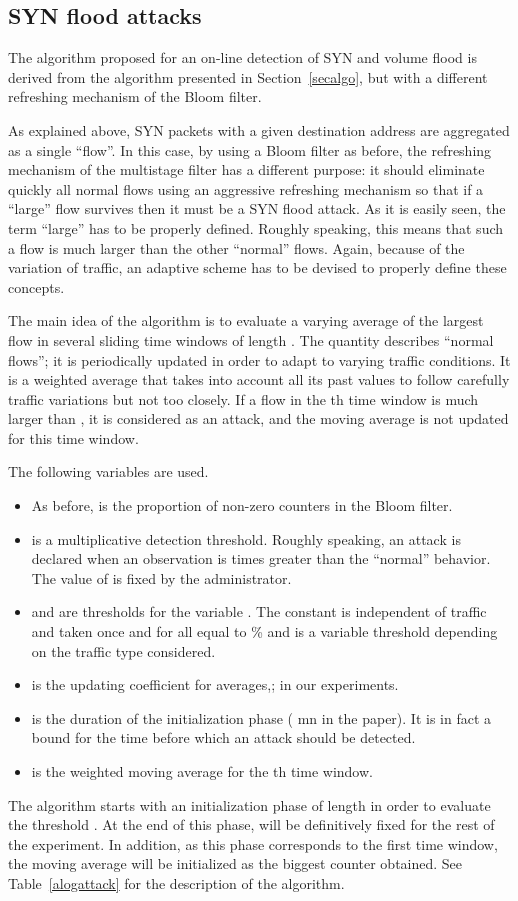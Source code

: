 \documentclass{amsart}
\begin{document}
\subsection{SYN flood attacks}

The  algorithm proposed for an on-line detection of SYN and volume flood is derived  from
 the algorithm presented  in Section~\ref{secalgo}, but with a different refreshing 
mechanism of the Bloom filter. 

As explained above, SYN packets  with a given  destination  address are  aggregated  as a  single 
``flow''. In this case, by using a Bloom filter as before,  the refreshing mechanism of the
multistage filter has a different purpose: it should eliminate quickly all normal flows
using an aggressive refreshing mechanism so that if a ``large''  flow survives then it must
be a SYN flood attack. As it is easily seen, the term ``large''  has to be properly
defined. Roughly speaking, this means that such a flow  is much larger  than the other ``normal'' flows. 
Again, because of the variation of traffic, an adaptive scheme has to be devised to properly define
 these concepts. 

The main idea of the algorithm is to  evaluate a varying average  of the largest flow
in several sliding time windows of  length . The quantity  describes ``normal
flows''; it is periodically updated in order to adapt to varying traffic conditions. It is
a weighted average that takes into account all its past values to follow carefully traffic
variations but  not too closely. If  a flow in the  th time window is  much larger than
, it is considered  as an attack, and the moving average  is not updated for this
time window.

The following variables are used. 
\begin{itemize}
\item As before,  is the proportion of non-zero counters in the Bloom filter. 
\item  is a multiplicative detection threshold. Roughly speaking, an attack is declared
when an observation is  times greater than the ``normal'' behavior. The value of  is fixed  by
the administrator. 
\item  and   are thresholds for the variable . The constant   is 
 independent of traffic and  taken once and for all  equal to \%  and  is a
 variable threshold depending on the traffic type considered.  
\item  is the updating coefficient for averages,;  in our experiments. 
\item  is the  duration of the initialization phase ( mn in the paper). It is in fact a bound for the time before which
an attack should be detected.
\item  is the weighted moving average for the th time window.
\end{itemize}
The algorithm starts with an initialization phase of length  in order to evaluate
the threshold . At the end of this phase,
 will be definitively fixed for the rest of the experiment.  In addition, as this phase
corresponds to the first time window, the moving average  will be initialized as the
biggest counter obtained.  See Table~\ref{alogattack} for the description of the algorithm.
\end{document}
